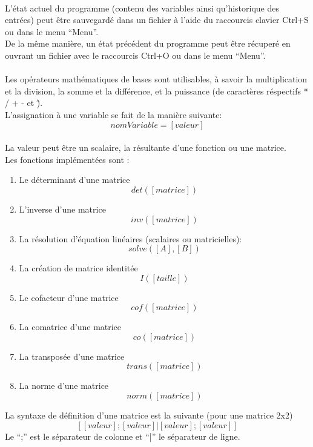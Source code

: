         \paragraph{}
            L'état actuel du programme (contenu des variables ainsi qu'historique des entrées) peut être sauvegardé dans un fichier à l'aide du raccourcis clavier Ctrl+S ou dans le menu ``Menu''.
            \\ De la même manière, un état précédent du programme peut être récuperé en ouvrant un fichier avec le raccourcis Ctrl+O ou dans le menu ``Menu''.

        \paragraph{}
            Les opérateurs mathématiques de bases sont utilisables, à savoir la multiplication et la division, la somme et la différence, et la puissance (de caractères réspectifs * / + - et \^).
            \\L'assignation à une variable se fait de la manière suivante: \[nomVariable = [valeur]\] 
            \\ La valeur peut être un scalaire, la résultante d'une fonction ou une matrice.
            \\ Les fonctions implémentées sont :
            \begin{enumerate}
                \item Le déterminant d'une matrice \[det([matrice])\]
                \item L'inverse d'une matrice \[inv([matrice])\]
                \item La résolution d'équation linéaires (scalaires ou matricielles): \[solve([A], [B])\] 
                \item La création de matrice identitée \[I([taille])\]
                \item Le cofacteur d'une matrice \[cof([matrice])\]
                \item La comatrice d'une matrice \[co([matrice])\]
                \item La transposée d'une matrice \[trans([matrice])\]
                \item La norme d'une matrice \[norm([matrice])\]
            \end{enumerate}
            La syntaxe de définition d'une matrice est la suivante (pour une matrice 2x2)
                \[ [ [valeur]; [valeur] | [valeur]; [valeur] ]\]
            Le ``;'' est le séparateur de colonne et ``|'' le séparateur de ligne.
